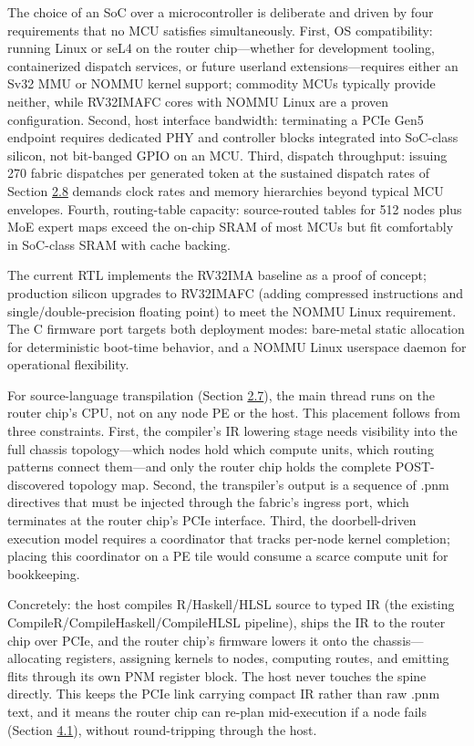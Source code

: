 \documentclass[12pt,onecolumn]{article}
\begin{document}
The choice of an SoC over a microcontroller is deliberate and driven by four requirements that no MCU satisfies simultaneously. First, OS compatibility: running Linux or seL4 on the router chip---whether for development tooling, containerized dispatch services, or future userland extensions---requires either an Sv32 MMU or NOMMU kernel support; commodity MCUs typically provide neither, while RV32IMAFC cores with NOMMU Linux are a proven configuration\cite{29}. Second, host interface bandwidth: terminating a PCIe Gen5 endpoint requires dedicated PHY and controller blocks integrated into SoC-class silicon, not bit-banged GPIO on an MCU. Third, dispatch throughput: issuing 270 fabric dispatches per generated token at the sustained dispatch rates of Section \hyperref[sec:2.8]{2.8} demands clock rates and memory hierarchies beyond typical MCU envelopes. Fourth, routing-table capacity: source-routed tables for 512 nodes plus MoE expert maps exceed the on-chip SRAM of most MCUs but fit comfortably in SoC-class SRAM with cache backing.

The current RTL implements the RV32IMA baseline as a proof of concept; production silicon upgrades to RV32IMAFC (adding compressed instructions and single/double-precision floating point) to meet the NOMMU Linux requirement. The C firmware port targets both deployment modes: bare-metal static allocation for deterministic boot-time behavior, and a NOMMU Linux userspace daemon for operational flexibility.

For source-language transpilation (Section \hyperref[sec:2.7]{2.7}), the main thread runs on the router chip's CPU, not on any node PE or the host. This placement follows from three constraints. First, the compiler's IR lowering stage needs visibility into the full chassis topology---which nodes hold which compute units, which routing patterns connect them---and only the router chip holds the complete POST-discovered topology map. Second, the transpiler's output is a sequence of .pnm directives that must be injected through the fabric's ingress port, which terminates at the router chip's PCIe interface. Third, the doorbell-driven execution model requires a coordinator that tracks per-node kernel completion; placing this coordinator on a PE tile would consume a scarce compute unit for bookkeeping.

Concretely: the host compiles R/Haskell/HLSL source to typed IR (the existing CompileR/CompileHaskell/CompileHLSL pipeline), ships the IR to the router chip over PCIe, and the router chip's firmware lowers it onto the chassis---allocating registers, assigning kernels to nodes, computing routes, and emitting flits through its own PNM register block. The host never touches the spine directly. This keeps the PCIe link carrying compact IR rather than raw .pnm text, and it means the router chip can re-plan mid-execution if a node fails (Section \hyperref[sec:4.1]{4.1}), without round-tripping through the host.
\end{document}
